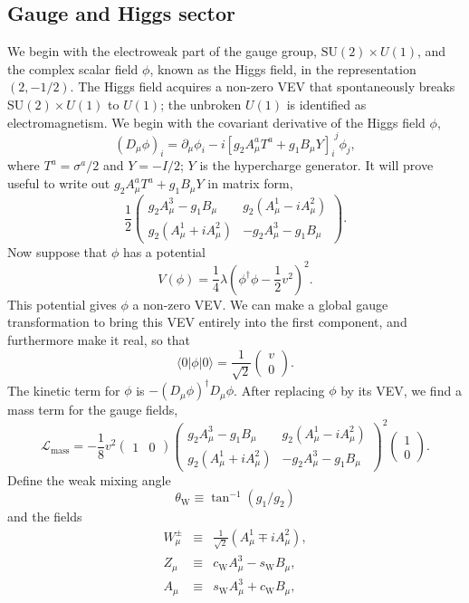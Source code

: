 \subsection{Gauge and Higgs sector}
We begin with the electroweak part of the gauge group, $\mathrm{SU}(2)\times U(1)$, and the complex scalar field $\phi$, known as the Higgs field, in the representation $(2,-{1}/{2})$. The Higgs field acquires a non-zero VEV that spontaneously breaks $\mathrm{SU}(2)\times U(1)$ to $U(1)$; the unbroken $U(1)$ is identified as electromagnetism.
We begin with the covariant derivative of the Higgs field $\phi$,
\[(D_{\mu}\phi)_i = \partial_{\mu}\phi_i - i[g_2 A^a_{\mu}T^a + g_1B_{\mu}Y]_{i}^{\phantom{i}j} \phi_j,\] where $T^a = {\sigma^a}/{2}$ and $Y = -{I}/{2}$; $Y$ is the hypercharge generator. It will prove
useful to write out $g_2 A^a_{\mu}T^a + g_1B_{\mu}Y$ in matrix form,
\[ \frac{1}{2} \begin{pmatrix}
g_2A^3_{\mu}-g_1B_{\mu} & g_2(A^1_{\mu} - iA^2_{\mu}) \\
g_2(A^1_{\mu} + iA^2_{\mu}) & -g_2A^3_{\mu}-g_1B_{\mu}
\end{pmatrix}.\]
Now suppose that $\phi$ has a potential
\[V(\phi) = \frac{1}{4}\lambda (\phi^{\dagger}\phi - \frac{1}{2}v^2)^2.\]
This potential gives $\phi$ a non-zero VEV. We can make a global gauge transformation to bring this VEV entirely into the first component, and furthermore make it real, so that
\[\langle 0 | \phi | 0 \rangle =  \frac{1}{\sqrt{2}}\begin{pmatrix}
v \\ 0
\end{pmatrix} .\]
The kinetic term for $\phi$ is $-(D_{\mu}\phi)^{\dagger}D_{\mu}\phi$. After replacing $\phi$ by its VEV, we find a mass term for the gauge fields,
\[\mathcal{L}_{\mathrm{mass}}  = - \frac{1}{8}v^2 \begin{pmatrix}
1 & 0 \end{pmatrix} \begin{pmatrix}
g_2A^3_{\mu}-g_1B_{\mu} & g_2(A^1_{\mu} - iA^2_{\mu}) \\
g_2(A^1_{\mu} + iA^2_{\mu}) & -g_2A^3_{\mu}-g_1B_{\mu}
\end{pmatrix}^2 \begin{pmatrix} 1 \\ 0 \end{pmatrix} .\]
Define the weak mixing angle
\[\theta_{\mathrm{W}} \equiv \tan^{-1}(g_1/g_2)\]
and the fields
\begin{eqnarray}
W^{\pm}_{\mu} &\equiv & \frac{1}{\sqrt{2}} (A^1_{\mu} \mp iA^2_{\mu}) ,\nonumber \\
Z_{\mu}  &\equiv & c_{\mathrm{W}} A^3_{\mu} - s_{\mathrm{W}} B_{\mu} ,\nonumber \\
A_{\mu}  &\equiv & s_{\mathrm{W}} A^3_{\mu} + c_{\mathrm{W}} B_{\mu} ,\nonumber
\end{eqnarray}
